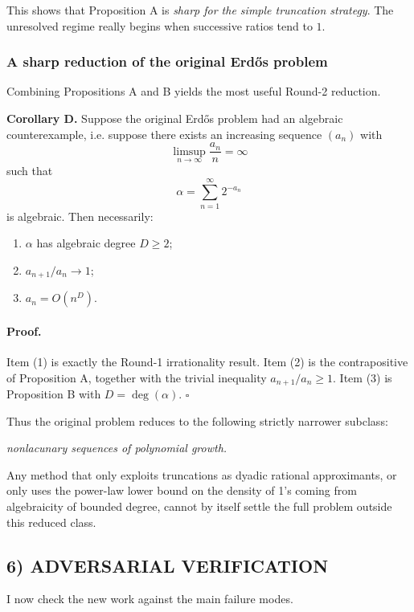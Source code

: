 \medskip
This shows that Proposition A is \emph{sharp for the simple truncation strategy}. The unresolved regime really begins when successive ratios tend to $1$.

\subsubsection*{A sharp reduction of the original Erd\H{o}s problem}
Combining Propositions A and B yields the most useful Round-2 reduction.

\textbf{Corollary D.}
Suppose the original Erd\H{o}s problem had an algebraic counterexample, i.e. suppose there exists an increasing sequence $(a_n)$ with
\[
\limsup_{n\to\infty}\frac{a_n}{n}=\infty
\]
such that
\[
\alpha=\sum_{n=1}^\infty 2^{-a_n}
\]
is algebraic. Then necessarily:
\begin{enumerate}
\item $\alpha$ has algebraic degree $D\ge 2$;
\item $a_{n+1}/a_n\to 1$;
\item $a_n=O(n^D)$.
\end{enumerate}

\paragraph{Proof.}
Item (1) is exactly the Round-1 irrationality result.
Item (2) is the contrapositive of Proposition A, together with the trivial inequality $a_{n+1}/a_n\ge 1$.
Item (3) is Proposition B with $D=\deg(\alpha)$.
\hfill$\square$

Thus the original problem reduces to the following strictly narrower subclass:

\medskip
\centerline{\emph{nonlacunary sequences of polynomial growth.}}
\medskip

Any method that only exploits truncations as dyadic rational approximants, or only uses the power-law lower bound on the density of 1's coming from algebraicity of bounded degree, cannot by itself settle the full problem outside this reduced class.

\subsection*{6) ADVERSARIAL VERIFICATION}
I now check the new work against the main failure modes.

